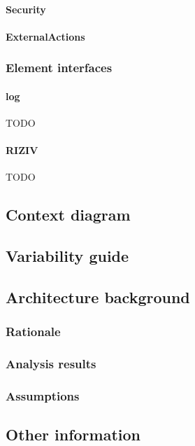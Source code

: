 \documentclass[a4paper,10pt]{paper}
\begin{document}
\paragraph{Security}

\paragraph{ExternalActions}

\subsubsection{Element interfaces} 

\paragraph{log}
TODO

\paragraph{RIZIV}
TODO

\subsection{Context diagram}

\subsection{Variability guide}

\subsection{Architecture background}

\subsubsection{Rationale}

\subsubsection{Analysis results}

\subsubsection{Assumptions}

\subsection{Other information}
\end{document}
